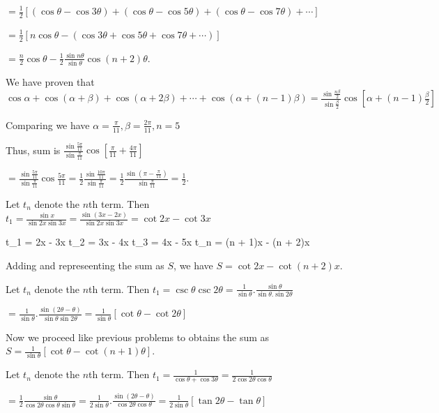  $= \frac{1}{2}[(\cos\theta - \cos3\theta) + (\cos\theta - \cos5\theta) + (\cos\theta - \cos7\theta) +
  \cdots]$

  $= \frac{1}{2}[n\cos\theta - (\cos3\theta + \cos5\theta + \cos7\theta + \cdots)]$

  $= \frac{n}{2}\cos\theta - \frac{1}{2}\frac{\sin n\theta}{\sin\theta}\cos(n + 2)\theta$.
\item We have proven that $\cos\alpha + \cos(\alpha + \beta) + \cos(\alpha + 2\beta) + \cdots + \cos(\alpha
  + (n - 1)\beta) = \frac{\sin\frac{n\beta}{2}}{\sin\frac{\beta}{2}}\cos\left[\alpha + (n -
    1)\frac{\beta}{2}\right]$

  Comparing we have $\alpha = \frac{\pi}{11}, \beta = \frac{2\pi}{11}, n = 5$

  Thus, sum is $\frac{\sin\frac{5\pi}{11}}{\sin\frac{\pi}{11}}\cos\left[\frac{\pi}{11} +
    \frac{4\pi}{11}\right]$

  $= \frac{\sin\frac{5\pi}{11}}{\sin\frac{\pi}{11}}\cos\frac{5\pi}{11} =
  \frac{1}{2}\frac{\sin\frac{10\pi}{11}}{\sin\frac{\pi}{11}} = \frac{1}{2}\frac{\sin\left(\pi -
      \frac{\pi}{11}\right)}{\sin\frac{\pi}{11}} = \frac{1}{2}$.
\item Let $t_n$ denote the $n$th term. Then $t_1 = \frac{\sin x}{\sin2x\sin3x} = \frac{\sin(3x -
    2x)}{\sin2x\sin3x} = \cot2x - \cot3x$

  \startformula\startalign
    \NC t_1 \NC = \cot2x - \cot3x\NR
    \NC t_2 \NC = \cot3x - \cot4x\NR
    \NC t_3 \NC = \cot4x - \cot5x\NR
    \NC \NC \cdots\NR
    \NC t_n \NC = \cot(n + 1)x - \cot(n + 2)x\NR
  \stopalign\stopformula

  Adding and represeenting the sum as $S$, we have $S = \cot2x - \cot(n + 2)x$.
\item Let $t_n$ denote the $n$th term. Then $t_1 = \csc\theta\csc2\theta =
  \frac{1}{\sin\theta}.\frac{\sin\theta}{\sin\theta.\sin2\theta}$

  $= \frac{1}{\sin\theta}.\frac{\sin(2\theta - \theta)}{\sin\theta\sin2\theta} =
  \frac{1}{\sin\theta}[\cot\theta - \cot2\theta]$

  Now we proceed like previous problems to obtains the sum as $S = \frac{1}{\sin\theta}[\cot\theta - \cot(n
  + 1)\theta]$.
\item Let $t_n$ denote the $n$th term. Then $t_1 = \frac{1}{\cos\theta + \cos3\theta} =
  \frac{1}{2\cos2\theta\cos\theta}$

  $= \frac{1}{2}\frac{\sin\theta}{\cos2\theta\cos\theta\sin\theta} =
  \frac{1}{2\sin\theta}.\frac{\sin(2\theta - \theta)}{\cos2\theta\cos\theta} =
  \frac{1}{2\sin\theta}[\tan2\theta - \tan\theta]$

